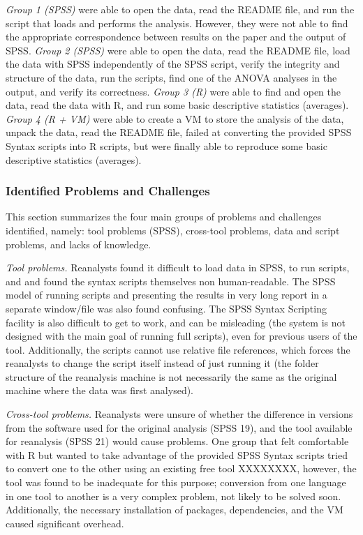 \emph{Group 1 (SPSS)} were able to open the data, read the README file, and run the script that loads and performs the analysis. However, they were not able to find the appropriate correspondence between results on the paper and the output of SPSS. 
\emph{Group 2 (SPSS)} were able to open the data, read the README file, load the data with SPSS independently of the SPSS script, verify the integrity and structure of the data, run the scripts, find one of the ANOVA analyses in the output, and verify its correctness.
\emph{Group 3 (R)} were able to find and open the data, read the data with R, and run some basic descriptive statistics (averages).
\emph{Group 4 (R + VM)} were able to create a VM to store the analysis of the data, unpack the data, read the README file, failed at converting the provided SPSS Syntax scripts into R scripts, but were finally able to reproduce some basic descriptive statistics (averages).

\subsubsection{Identified Problems and Challenges}
This section summarizes the four main groups of problems and challenges identified, namely: tool problems (SPSS), cross-tool problems, data and script problems, and lacks of knowledge.

\emph{Tool problems.} Reanalysts found it difficult to load data in SPSS, to run scripts, and and found the syntax scripts themselves non human-readable. The SPSS model of running scripts and presenting the results in very long report in a separate window/file was also found confusing. The SPSS Syntax Scripting facility is also difficult to get to work, and can be misleading (the system is not designed with the main goal of running full scripts), even for previous users of the tool. Additionally, the scripts cannot use relative file references, which forces the reanalysts to change the script itself instead of just running it (the folder structure of the reanalysis machine is not necessarily the same as the original machine where the data was first analysed). 

\emph{Cross-tool problems.} Reanalysts were unsure of whether the difference in versions from the software used for the original analysis (SPSS 19), and the tool available for reanalysis (SPSS 21) would cause problems. One group that felt comfortable with R but wanted to take advantage of the provided SPSS Syntax scripts tried to convert one to the other using an existing free tool XXXX\cite{Ian's Group Should find reference for this tool}XXXX, however, the tool was found to be inadequate for this purpose; conversion from one language in one tool to another is a very complex problem, not likely to be solved soon. Additionally, the necessary installation of packages, dependencies, and the VM caused significant overhead.

